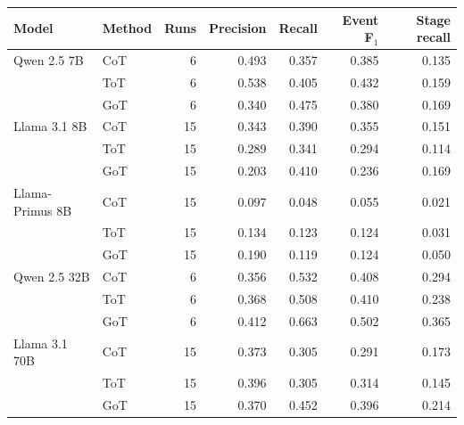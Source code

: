 \begin{tabular}{@{}llrrrrr@{}}
\toprule
Model & Method & Runs & Precision & Recall & Event F$_1$ & Stage recall \\
\midrule
Qwen 2.5 7B & CoT & 6 & 0.493 & 0.357 & 0.385 & 0.135 \\
 & ToT & 6 & 0.538 & 0.405 & 0.432 & 0.159 \\
 & GoT & 6 & 0.340 & 0.475 & 0.380 & 0.169 \\
\addlinespace
Llama 3.1 8B & CoT & 15 & 0.343 & 0.390 & 0.355 & 0.151 \\
 & ToT & 15 & 0.289 & 0.341 & 0.294 & 0.114 \\
 & GoT & 15 & 0.203 & 0.410 & 0.236 & 0.169 \\
\addlinespace
Llama-Primus 8B & CoT & 15 & 0.097 & 0.048 & 0.055 & 0.021 \\
 & ToT & 15 & 0.134 & 0.123 & 0.124 & 0.031 \\
 & GoT & 15 & 0.190 & 0.119 & 0.124 & 0.050 \\
\addlinespace
Qwen 2.5 32B & CoT & 6 & 0.356 & 0.532 & 0.408 & 0.294 \\
 & ToT & 6 & 0.368 & 0.508 & 0.410 & 0.238 \\
 & GoT & 6 & 0.412 & 0.663 & 0.502 & 0.365 \\
\addlinespace
Llama 3.1 70B & CoT & 15 & 0.373 & 0.305 & 0.291 & 0.173 \\
 & ToT & 15 & 0.396 & 0.305 & 0.314 & 0.145 \\
 & GoT & 15 & 0.370 & 0.452 & 0.396 & 0.214 \\
\bottomrule
\end{tabular}
